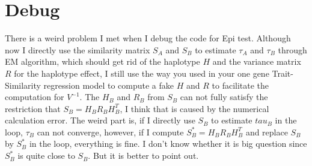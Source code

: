 \documentclass{article}
\begin{document}
    \section{Debug}
        There is a weird problem I met when I debug the code for Epi test. Although now I directly use the similarity matrix $S_A$ and $S_B$ to estimate $\tau_A$ and $\tau_B$ through EM algorithm, which should get rid of the haplotype $H$ and the variance matrix $R$ for the haplotype effect, I still use the way you used in your one gene Trait-Similarity regression model to compute a fake $H$ and $R$ to facilitate the computation for $V^{-1}$. The $H_B$ and $R_B$ from $S_B$ can not fully satisfy the restriction that $S_B=H_BR_BH^T_B$, I think that is caused by the numerical calculation error. The weird part is, if I directly use $S_B$ to estimate $tau_B$ in the loop, $\tau_B$ can not converge, however, if I compute $S^*_B=H_BR_BH^T_B$ and replace $S_B$ by $S^*_B$ in the loop, everything is fine. I don't know whether it is big question since $S^*_B$ is quite close to $S_B$. But it is better to point out.
        
        
         
\end{document}
